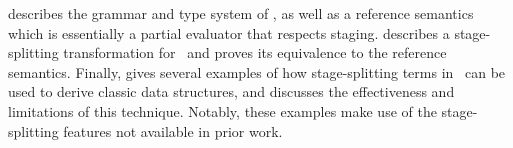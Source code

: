  describes the grammar and type system of \lang, as well as
a reference semantics which is essentially a partial evaluator that respects
staging.  describes a stage-splitting transformation for
\lang\ and proves its equivalence to the reference semantics.  Finally,
 gives several examples of how stage-splitting terms in
\lang\ can be used to derive classic data structures, and discusses the
effectiveness and limitations of this technique.  Notably, these examples make
use of the stage-splitting features not available in prior work.


